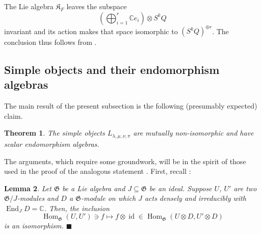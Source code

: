 \documentclass[11pt]{article}
\theoremstyle{plain}
\newtheorem{lemma}{Lemma}[section]
\newtheorem{theorem}[lemma]{Theorem}
\theoremstyle{nonumberplain}
\theoremstyle{plain}
\numberwithin{equation}{section}
\theoremstyle{nonumberplain}
\newcommand\bC{{\mathbb C}}
\newcommand\fG{{\mathfrak G}}
\newcommand\fK{{\mathfrak K}}
\newcommand\1{{\bf 1}}
\DeclareMathOperator{\id}{id}
\DeclareMathOperator{\End}{\mathrm{End}}
\DeclareMathOperator{\Hom}{\mathrm{Hom}}
\newcommand{\qedhere}{\mbox{}\hfill\ensuremath{\blacksquare}}
\begin{document}
\begin{pr.soc}
  The Lie algebra $\fK_F$ leaves the subspace
  \begin{equation*}
    \left(\bigoplus_{i=1}^r \bC e_i \right)\otimes S^kQ
  \end{equation*}
  invariant and its action makes that space isomorphic to $(S^kQ)^{\oplus r}$. The conclusion thus follows from .
\end{pr.soc}


\subsection{Simple objects and their endomorphism algebras}\label{subse:endo}

The main result of the present subsection is the following (presumably expected) claim.

\begin{theorem}\label{th:scalaralgs}
The simple objects $L_{\lambda,\mu,\nu,\pi}$ are mutually non-isomorphic and have scalar endomorphism algebras.   
\end{theorem}

The arguments, which require some groundwork, will be in the spirit of those used in the proof of the analogous statement \cite[Theorem 3.5]{us0}. First, recall \cite[Lemma 3.1]{us0}:



\begin{lemma}\label{le:dense-us0}
  Let $\fG$ be a Lie algebra and $J\subseteq \fG$ be an ideal. Suppose $U$, $U'$ are two $\fG/J$-modules and $D$ a $\fG$-module on which $J$ acts densely and irreducibly with $\End_J D=\bC$. Then, the inclusion
  \begin{equation*}
    \Hom_{\fG}(U,U')\ni f\mapsto f\otimes \id\in \Hom_{\fG}(U\otimes D,U'\otimes D)
  \end{equation*}
  is an isomorphism.
  \qedhere
\end{lemma}
\end{document}
